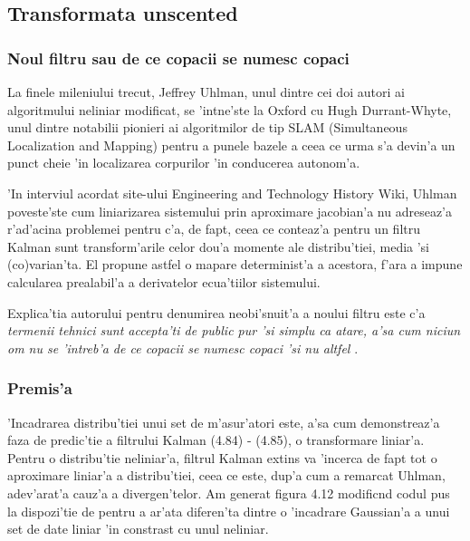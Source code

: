 \documentclass[12pt,a4paper,twoside]{report}
\begin{document}
\subsection{Transformata unscented}

\subsubsection{Noul filtru sau de ce copacii se numesc copaci}

La finele mileniului trecut, Jeffrey Uhlman, unul dintre cei doi autori ai algoritmului neliniar modificat, se 'int\ia ne'ste la Oxford cu Hugh Durrant-Whyte, unul dintre notabilii pionieri ai algoritmilor de tip SLAM (Simultaneous Localization and Mapping) \cite{1638022} pentru a punele bazele a ceea ce urma s'a devin'a un punct cheie 'in localizarea corpurilor 'in conducerea autonom'a. 

\vspace{5px}

'In interviul \cite{interview} acordat site-ului Engineering and Technology History Wiki, Uhlman poveste'ste cum liniarizarea sistemului prin aproximare jacobian'a nu adreseaz'a r'ad'acina problemei pentru c'a, de fapt, ceea ce conteaz'a pentru un filtru Kalman sunt transform'arile celor dou'a momente ale distribu'tiei, media 'si (co)varian'ta. El propune astfel o mapare determinist'a a acestora, f'ara a impune calcularea prealabil'a a derivatelor ecua'tiilor sistemului.

\vspace{5px}

Explica'tia autorului pentru denumirea neobi'snuit'a a noului filtru este c'a \textit{termenii tehnici sunt accepta'ti de public pur 'si simplu ca atare, a'sa cum niciun om nu se 'intreb'a de ce copacii se numesc copaci 'si nu altfel} \cite{interview}.

\subsubsection{Premis'a}

'Incadrarea distribu'tiei unui set de m'asur'atori este, a'sa cum demonstreaz'a faza de predic'tie a filtrului Kalman (4.84) - (4.85), o transformare liniar'a. Pentru o distribu'tie neliniar'a, filtrul Kalman extins va 'incerca de fapt tot o aproximare liniar'a a distribu'tiei, ceea ce este, dup'a cum a remarcat Uhlman, adev'arat'a cauz'a a divergen'telor. Am generat figura 4.12 modific\ia nd codul pus la dispozi'tie de \cite{visiondummy} pentru a ar'ata diferen'ta dintre o 'incadrare Gaussian'a a unui set de date liniar 'in constrast cu unul neliniar.
\end{document}
